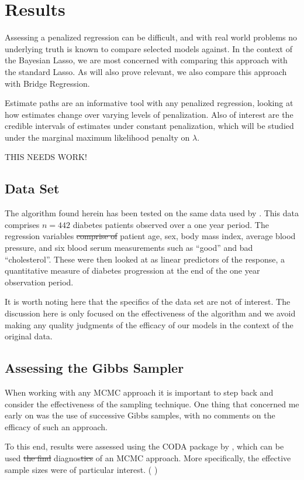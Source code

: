 \documentclass{uwstat572}
\newcommand{\vmdel}[1]{\sout{#1}}
\newcommand{\vmadd}[1]{\textbf{\color{red}{#1}}}
\newcommand{\vmcomment}[1]{({\color{blue}{VM's comment:}} \textbf{\color{blue}{#1}})}
\begin{document}
\section{Results}
Assessing a penalized regression can be difficult, and with real world problems no underlying truth is known to compare selected models against. In the context of the Bayesian Lasso, we are most concerned with comparing this approach with the standard Lasso. As will also prove relevant, we also compare this approach with Bridge Regression. 

Estimate paths are an informative tool with any penalized regression, looking at how estimates change over varying levels of penalization. Also of interest are the credible intervals of estimates under constant penalization, which will be studied under the marginal maximum likelihood penalty on $\lambda$.

THIS NEEDS WORK!

\subsection{Data Set}
The algorithm found herein has been tested on the same data used by \cite{efron2004least}. This data comprises $n=442$ diabetes patients observed over a one year period. 
The regression variables \vmdel{comprise of} \vmadd{are} patient age, sex, body mass index, average blood pressure, and six blood serum measurements\vmadd{,} such as ``good'' and bad ``cholesterol''. 
These were then looked at as linear predictors of the response, a quantitative measure of diabetes progression at the end of the one year observation period.

It is worth noting here that the specifics of the data set are not of interest. The discussion here is only focused on the effectiveness of the algorithm and we avoid making any quality judgments of the efficacy of our models in the context of the original data.

\subsection{Assessing the Gibbs Sampler}
When working with any MCMC approach it is important to step back and consider the effectiveness of the sampling technique. One thing that concerned me early on was the use of successive Gibbs samples, with no comments on the efficacy of such an approach.

To this end, results were assessed using the CODA package by \cite{codapackage}, which can be used \vmdel{the find} \vmadd{to} diagnos\vmadd{e}\vmdel{tics} of an MCMC approach. More specifically, the effective sample sizes\vmadd{, which reflect mixing of the chain,} were of particular interest. 
\vmcomment{Comment on MCMC convergence too.}
\end{document}
